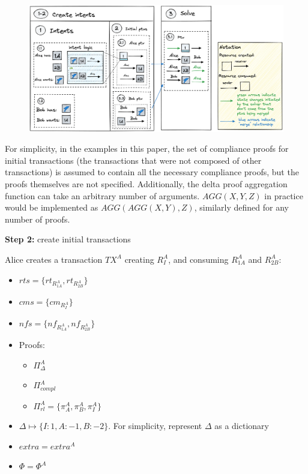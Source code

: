\begin{figure}[!h]
\begin{center}
    \includegraphics[width = \textwidth]{2party_rm_new.png}
\end{center}
\end{figure}

\begin{remark}
    For simplicity, in the examples in this paper, the set of compliance proofs for initial transactions (the transactions that were not composed of other transactions) is assumed to contain all the necessary compliance proofs, but the proofs themselves are not specified. Additionally, the delta proof aggregation function can take an arbitrary number of arguments. $AGG(X, Y, Z)$ in practice would be implemented as $AGG(AGG(X, Y), Z)$, similarly defined for any number of proofs.
\end{remark}

\textbf{Step 2:} create initial transactions

Alice creates a transaction $TX^A$ creating $R^A_I$, and consuming $R^A_{1A}$ and $R^A_{2B}$:
\begin{itemize}
    \item $rts= \{rt_{R^A_{1A}}, rt_{R^A_{2B}}\}$
    \item $cms = \{cm_{R^A_I}\}$
    \item $nfs = \{nf_{R^A_{1A}}, nf_{R^A_{2B}}\}$
    \item Proofs:
    \begin{itemize}
        \item $\Pi^A_{\Delta}$
        \item $\Pi^A_{compl}$
        \item $\Pi^A_{rl} = \{\pi^A_A, \pi^A_B, \pi^A_I\}$
    \end{itemize}
    \item $\Delta \mapsto \{I: 1, A: -1, B: -2\}$. For simplicity, represent $\Delta$ as a dictionary
    \item $extra = extra^A$
    \item $\Phi = \Phi^A$
\end{itemize}

